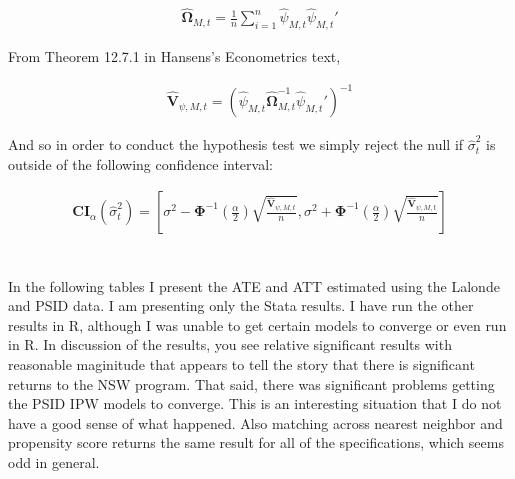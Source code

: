 \documentclass[12pt]{article}
\newcommand{\qsum}{\sum\limits_{i=1}^n}
\begin{document}
\begin{align*}
  \hat{\mathbf{\Omega}}_{M,t}  = \frac{1}{n} \qsum \hat \psi_{M,t} \hat\psi_{M,t}'
\end{align*}

From Theorem 12.7.1 in Hansens's Econometrics text,

\begin{align*}
  \mathbf{\hat{V}}_{\psi,M,t} = (\hat \psi_{M,t} \hat{\mathbf{\Omega}}_{M,t}^{-1}   \hat\psi_{M,t}')^{-1}
\end{align*}

And so in order to conduct the hypothesis test we simply reject the null if $\hat\sigma_t^2$ is outside of the following confidence interval:

\begin{align*}
\mathbf{CI}_{\alpha} (\hat\sigma_t^2) = \left[\sigma^2  - \mathbf{\Phi}^{-1}(\frac{\alpha}{2}) \sqrt{\frac{\mathbf{\hat{V}}_{\psi,M,t}}{n}}   , \sigma^2  + \mathbf{\Phi}^{-1}(\frac{\alpha}{2}) \sqrt{\frac{\mathbf{\hat{V}}_{\psi,M,t}}{n}}  \right]
\end{align*}


\newpage
\section{}
In the following tables I present the ATE and ATT estimated using the Lalonde and PSID data. I am presenting only the Stata results. I have run the other results in R, although I was unable to get certain models to converge or even run in R. In discussion of the results, you see relative significant results with reasonable maginitude that appears to tell the story that there is significant returns to the NSW program. That said, there was significant problems getting the PSID IPW models to converge. This is an interesting situation that I do not have a good sense of what happened. Also matching across nearest neighbor and propensity score returns the same result for all of the specifications, which seems odd in general.
\end{document}
